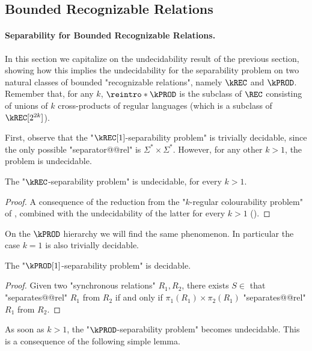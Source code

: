 \subsection{Bounded Recognizable Relations}

\paragraph*{Separability for Bounded Recognizable Relations.}

In this section we capitalize on the undecidability result of the previous section, showing how this implies the undecidability for the separability problem on two natural classes of bounded "recognizable relations", namely $\kREC$ and $\kPROD$.
Remember that, for any $k$, $\reintro*\kPROD$ is the subclass of $\REC$ consisting of unions of $k$ cross-products of regular languages (which is a subclass of $\kREC[2^{2k}]$).

First, observe that the "$\kREC[1]$-separability problem" is trivially decidable, since the only possible "separator@@rel" is $\Sigma^* \times \Sigma^*$. However, for any other $k>1$, the problem is undecidable.

\begin{proposition}
    The "$\kREC$-separability problem" is undecidable, for every $k>1$.
\end{proposition}
\begin{proof}
A consequence of the reduction from the "$k$-regular colourability problem" of , combined with the undecidability of the latter for every $k>1$ ().
\end{proof}

On the $\kPROD$ hierarchy we will find the same phenomenon. In particular the case $k=1$ is also trivially decidable.

\begin{proposition}
    The "$\kPROD[1]$-separability problem" is decidable.
\end{proposition}
\begin{proof}
    Given two "synchronous relations" $R_1, R_2$, there exists $S \in $ \kPROD[1]
    that "separates@@rel" $R_1$ from $R_2$ if and only if $\pi_1(R_1)\times \pi_2(R_1)$
    "separates@@rel" $R_1$ from $R_2$.
\end{proof}

As soon as $k>1$, the "$\kPROD$-separability problem" becomes undecidable. This is a consequence of the following simple lemma.

